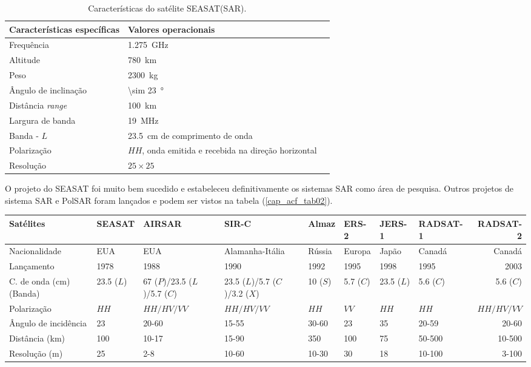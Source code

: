 \begin{table}[hbt]
	\centering
	\caption{Características do satélite SEASAT(SAR).}\label{cap_acf_tab01}
\begin{tabular}{@{}llr@{}} \toprule
	Características específicas& Valores operacionais  \\ \midrule
	Frequência           & \SI{1.275}{\GHz}  \\ 
	Altitude             & \SI{780}{\km}   \\
	Peso                 & \SI{2300}{\kilogram}   \\
	Ângulo de inclinação & \SI{\sim 23}{\degree}   \\
	Distância {\it range}& \SI{100}{\km}  \\
	Largura de banda     & \SI{19}{\MHz}   \\
	Banda - $L$          & \SI{23.5}{\cm} de comprimento de onda\\
	Polarização          & $HH$, onda emitida e recebida na direção horizontal \\
	Resolução            & $25 \times 25$  \\ \bottomrule

\end{tabular}
\end{table}
  
O projeto do SEASAT foi muito bem sucedido e estabeleceu definitivamente os sistemas SAR como área de pesquisa. Outros projetos de sistema SAR e PolSAR foram lançados e podem ser vistos na tabela (\ref{cap_acf_tab02}).

\begin{sidewaystable}
	\centering
	\caption{Características operacionais dos satélites SAR ou PolSAR.}\label{cap_acf_tab02}
\begin{tabular}{@{}llllllllr@{}} \toprule
Satélites      & 	SEASAT  &AIRSAR &SIR-C& Almaz&ERS-2& JERS-1& RADSAT-1&RADSAT-2 \\ \midrule
Nacionalidade       &EUA    &EUA&Alamanha-Itália&Rússia&Europa&Japão&Canadá&Canadá  \\ 
Lançamento          &1978   &1988        &1990  &1992  &1995 &1998  &1995  & 2003\\
C. de onda (\si{\cm}) (Banda) & 23.5 ($L$)&67 ($P$)/23.5 ($L$)/5.7 ($C$)&23.5 ($L$)/5.7 ($C$)/3.2 ($X$)&10 ($S$)&5.7 ($C$)&23.5 ($L$)&5.6 ($C$)&5.6 ($C$)\\
Polarização         &$HH$&$HH/HV/VV$&$HH/HV/VV$&$HH$&$VV$&$HH$&$HH$&$HH/HV/VV$\\
Ângulo de incidência&23&20-60&15-55&30-60&23&35&20-59&20-60\\
Distância (\si{\km})           &100&10-17&15-90&350&100&75&50-500&10-500\\
Resolução (\si{\m})         &25&2-8&10-60&10-30&30&18&10-100&3-100\\ \bottomrule
\end{tabular}
\end{sidewaystable}

